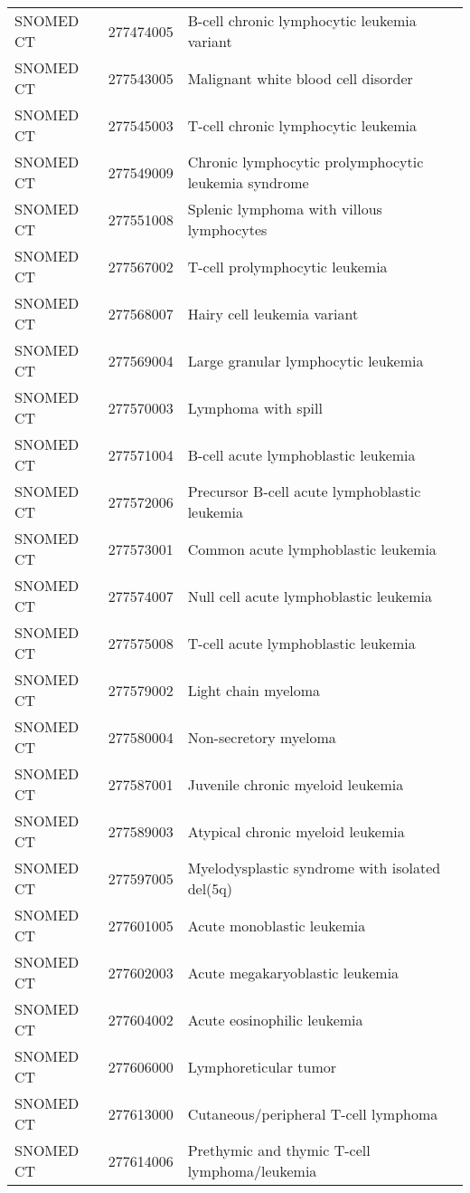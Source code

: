\begin{longtable}{p{}p{}p{}}
  SNOMED CT & 277474005 & B-cell chronic lymphocytic leukemia variant \\ 
  SNOMED CT & 277543005 & Malignant white blood cell disorder \\ 
  SNOMED CT & 277545003 & T-cell chronic lymphocytic leukemia \\ 
  SNOMED CT & 277549009 & Chronic lymphocytic prolymphocytic leukemia syndrome \\ 
  SNOMED CT & 277551008 & Splenic lymphoma with villous lymphocytes \\ 
  SNOMED CT & 277567002 & T-cell prolymphocytic leukemia \\ 
  SNOMED CT & 277568007 & Hairy cell leukemia variant \\ 
  SNOMED CT & 277569004 & Large granular lymphocytic leukemia \\ 
  SNOMED CT & 277570003 & Lymphoma with spill \\ 
  SNOMED CT & 277571004 & B-cell acute lymphoblastic leukemia \\ 
  SNOMED CT & 277572006 & Precursor B-cell acute lymphoblastic leukemia \\ 
  SNOMED CT & 277573001 & Common acute lymphoblastic leukemia \\ 
  SNOMED CT & 277574007 & Null cell acute lymphoblastic leukemia \\ 
  SNOMED CT & 277575008 & T-cell acute lymphoblastic leukemia \\ 
  SNOMED CT & 277579002 & Light chain myeloma \\ 
  SNOMED CT & 277580004 & Non-secretory myeloma \\ 
  SNOMED CT & 277587001 & Juvenile chronic myeloid leukemia \\ 
  SNOMED CT & 277589003 & Atypical chronic myeloid leukemia \\ 
  SNOMED CT & 277597005 & Myelodysplastic syndrome with isolated del(5q) \\ 
  SNOMED CT & 277601005 & Acute monoblastic leukemia \\ 
  SNOMED CT & 277602003 & Acute megakaryoblastic leukemia \\ 
  SNOMED CT & 277604002 & Acute eosinophilic leukemia \\ 
  SNOMED CT & 277606000 & Lymphoreticular tumor \\ 
  SNOMED CT & 277613000 & Cutaneous/peripheral T-cell lymphoma \\ 
  SNOMED CT & 277614006 & Prethymic and thymic T-cell lymphoma/leukemia \\ 

\end{longtable}
